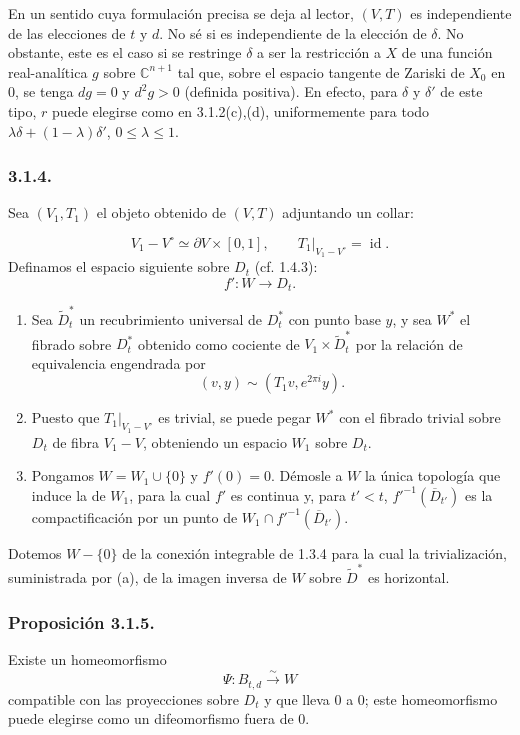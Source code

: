 En un sentido cuya formulación precisa se deja al lector, $(V,T)$ es
independiente de las elecciones de $t$ y $d$. No sé si es independiente
de la elección de $\delta$. No obstante, este es el caso si se restringe
$\delta$ a ser la restricción a $X$ de una función real-analítica $g$
sobre $\mathbb C^{n+1}$ tal que, sobre el espacio tangente de Zariski de
$X_0$ en $0$, se tenga $dg=0$ y $d^2g>0$ (definida positiva). En efecto,
para $\delta$ y $\delta'$ de este tipo, $r$ puede elegirse como en
3.1.2(c),(d), uniformemente para todo
$\lambda\delta+(1-\lambda)\delta'$, $0\leq\lambda\leq1$.

\subsubsection*{3.1.4.}
Sea $(V_1,T_1)$ el objeto obtenido de $(V,T)$ adjuntando un collar:

\pageoriginale

\[
V_1-V^\circ\simeq\partial V\times[0,1],
\qquad
T_1|_{V_1-V^\circ}=\operatorname{id}.
\]
Definamos el espacio siguiente sobre $D_t$ (cf. 1.4.3):
\[
f':W\longrightarrow D_t.
\]

\begin{enumerate}[label=(\alph*)]
\item Sea $\widetilde D_t^*$ un recubrimiento universal de $D_t^*$
  con punto base $y$, y sea $W^*$ el fibrado sobre $D_t^*$ obtenido
  como cociente de $V_1\times\widetilde D_t^*$ por la relación de
  equivalencia engendrada por
  \[
  (v,y)\sim(T_1v,e^{2\pi i}y).
  \]
\item Puesto que $T_1|_{V_1-V^\circ}$ es trivial, se puede pegar
  $W^*$ con el fibrado trivial sobre $D_t$ de fibra $V_1-V$, obteniendo
  un espacio $W_1$ sobre $D_t$.
\item Pongamos $W=W_1\cup\{0\}$ y $f'(0)=0$. Démosle a $W$ la
  única topología que induce la de $W_1$, para la cual $f'$ es
  continua y, para $t'<t$, ${f'}^{-1}(\overline D_{t'})$ es la
  compactificación por un punto de
  $W_1\cap {f'}^{-1}(\overline D_{t'})$.
\end{enumerate}

Dotemos $W-\{0\}$ de la conexión integrable de 1.3.4 para la cual la
trivialización, suministrada por (a), de la imagen inversa de $W$ sobre
$\widetilde D^*$ es horizontal.

\subsubsection*{Proposición 3.1.5.}
Existe un homeomorfismo
\[
\Psi:B_{t,d}\xrightarrow{\ \sim\ }W
\]
compatible con las proyecciones sobre $D_t$ y que lleva $0$ a $0$;
este homeomorfismo puede elegirse como un difeomorfismo fuera de $0$.

